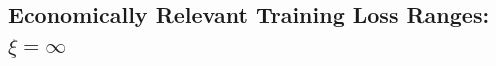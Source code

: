 \documentclass[12pt]{article}
\begin{document}
\begin{appendices}


\newpage
\clearpage

\subsection{Economically Relevant Training Loss Ranges: $\xi = \infty$}





\end{appendices}
\end{document}
